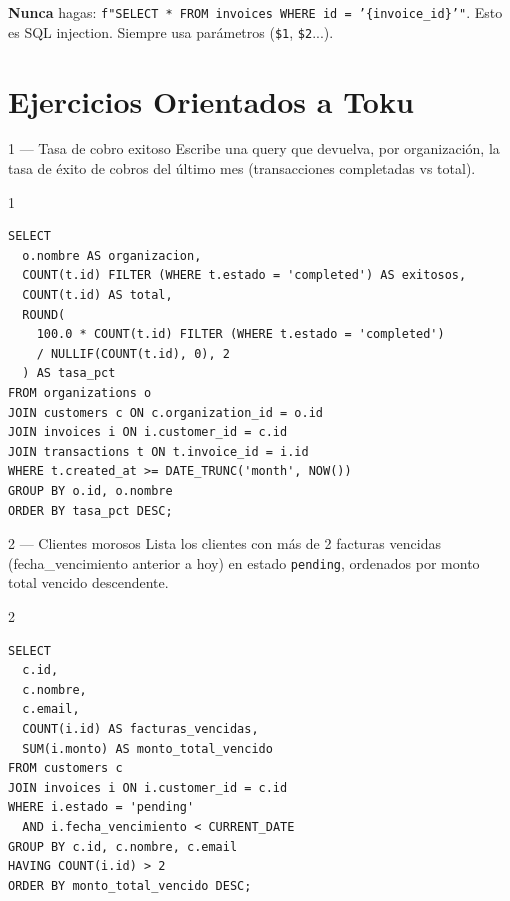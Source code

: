 \documentclass[11pt,a4paper]{article}
\begin{document}
\begin{alertbox}
\textbf{Nunca} hagas: \texttt{f"SELECT * FROM invoices WHERE id = '\{invoice\_id\}'"}.
Esto es SQL injection. Siempre usa parámetros (\texttt{\$1}, \texttt{\$2}...).
\end{alertbox}

\section{Ejercicios Orientados a Toku}

\begin{ejerciciobox}{1 — Tasa de cobro exitoso}
Escribe una query que devuelva, por organización, la tasa de éxito de cobros
del último mes (transacciones completadas vs total).
\end{ejerciciobox}

\begin{solucionbox}{1}
\begin{lstlisting}[style=sql]
SELECT
  o.nombre AS organizacion,
  COUNT(t.id) FILTER (WHERE t.estado = 'completed') AS exitosos,
  COUNT(t.id) AS total,
  ROUND(
    100.0 * COUNT(t.id) FILTER (WHERE t.estado = 'completed')
    / NULLIF(COUNT(t.id), 0), 2
  ) AS tasa_pct
FROM organizations o
JOIN customers c ON c.organization_id = o.id
JOIN invoices i ON i.customer_id = c.id
JOIN transactions t ON t.invoice_id = i.id
WHERE t.created_at >= DATE_TRUNC('month', NOW())
GROUP BY o.id, o.nombre
ORDER BY tasa_pct DESC;
\end{lstlisting}
\end{solucionbox}

\begin{ejerciciobox}{2 — Clientes morosos}
Lista los clientes con más de 2 facturas vencidas (fecha\_vencimiento anterior a hoy)
en estado \texttt{pending}, ordenados por monto total vencido descendente.
\end{ejerciciobox}

\begin{solucionbox}{2}
\begin{lstlisting}[style=sql]
SELECT
  c.id,
  c.nombre,
  c.email,
  COUNT(i.id) AS facturas_vencidas,
  SUM(i.monto) AS monto_total_vencido
FROM customers c
JOIN invoices i ON i.customer_id = c.id
WHERE i.estado = 'pending'
  AND i.fecha_vencimiento < CURRENT_DATE
GROUP BY c.id, c.nombre, c.email
HAVING COUNT(i.id) > 2
ORDER BY monto_total_vencido DESC;
\end{lstlisting}
\end{solucionbox}
\end{document}

